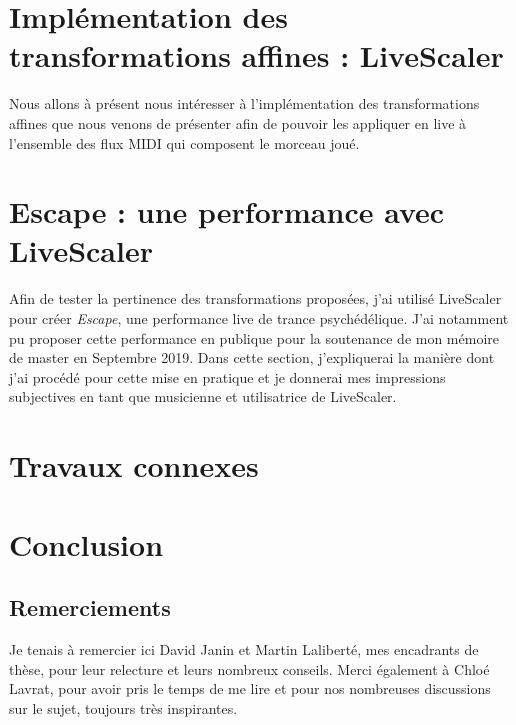 \documentclass{article}
\begin{document}








\section{Implémentation des transformations affines : LiveScaler}

Nous allons à présent nous intéresser à l'implémentation des transformations affines que nous venons de présenter afin de pouvoir les appliquer en live à l'ensemble des flux MIDI qui composent le morceau joué.









\section{Escape : une performance avec LiveScaler }
Afin de tester la pertinence des transformations proposées, j'ai utilisé LiveScaler pour créer \emph{Escape}, une performance live de trance psychédélique. J'ai notamment pu proposer cette performance en publique pour la soutenance de mon mémoire de master en Septembre 2019. Dans cette section, j'expliquerai la manière dont j'ai procédé pour cette mise en pratique et je donnerai mes impressions subjectives en tant que musicienne et utilisatrice de LiveScaler.




\section{Travaux connexes}



\section{Conclusion}


\subsection{Remerciements}
Je tenais à remercier ici David Janin et Martin Laliberté, mes encadrants de thèse, pour leur relecture et leurs nombreux conseils. Merci également à Chloé Lavrat, pour avoir pris le temps de me lire et pour nos nombreuses discussions sur le sujet, toujours très inspirantes.
\end{document}
